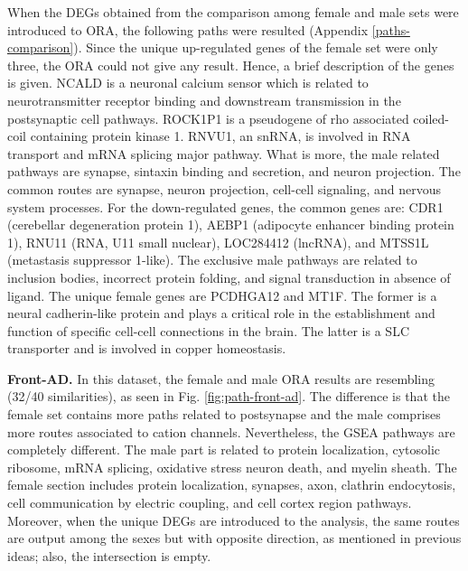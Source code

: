 When the DEGs obtained from the comparison among female and male sets were introduced to ORA, the following paths were resulted (Appendix \ref{paths-comparison}). Since the unique up-regulated genes of the female set were only three, the ORA could not give any result. Hence, a brief description of the genes is given. NCALD is a neuronal calcium sensor which is related to neurotransmitter receptor binding and downstream transmission in the postsynaptic cell pathways. ROCK1P1 is a pseudogene of rho associated coiled-coil containing protein kinase 1. RNVU1, an snRNA, is involved in RNA transport and mRNA splicing major pathway. What is more, the male related pathways are synapse, sintaxin binding and secretion, and neuron projection. The common routes are synapse, neuron projection, cell-cell signaling, and nervous system processes. For the down-regulated genes, the common genes are: CDR1 (cerebellar degeneration protein 1), AEBP1 (adipocyte enhancer binding protein 1), RNU11 (RNA, U11 small nuclear), LOC284412 (lncRNA), and MTSS1L (metastasis suppressor 1-like). The exclusive male pathways are related to inclusion bodies, incorrect protein folding, and signal transduction in absence of ligand. The unique female genes are PCDHGA12 and MT1F. The former is a neural cadherin-like protein and plays a critical role in the establishment and function of specific cell-cell connections in the brain. The latter is a SLC transporter and is involved in copper homeostasis.

\textbf{Front-AD.} In this dataset, the female and male ORA results are resembling (32/40 similarities), as seen in Fig. \ref{fig:path-front-ad}. The difference is that the female set contains more paths related to postsynapse and the male comprises more routes associated to cation channels. Nevertheless, the GSEA pathways are completely different. The male part is related to protein localization, cytosolic ribosome, mRNA splicing, oxidative stress neuron death, and myelin sheath. The female section includes protein localization, synapses, axon, clathrin endocytosis, cell communication by electric coupling, and cell cortex region pathways. Moreover, when the unique DEGs are introduced to the analysis, the same routes are output among the sexes but with opposite direction, as mentioned in previous ideas; also, the intersection is empty.

